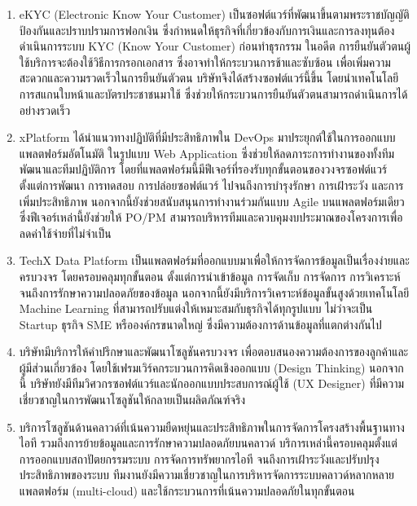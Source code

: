 \begin{enumerate}
  \item eKYC (Electronic Know Your Customer) เป็นซอฟต์แวร์ที่พัฒนาขึ้นตามพระราชบัญญัติป้องกันและปราบปรามการฟอกเงิน ซึ่งกำหนดให้ธุรกิจที่เกี่ยวข้องกับการเงินและการลงทุนต้องดำเนินการระบบ KYC (Know Your Customer) ก่อนทำธุรกรรม ในอดีต การยืนยันตัวตนผู้ใช้บริการจะต้องใช้วิธีการกรอกเอกสาร ซึ่งอาจทำให้กระบวนการช้าและซับซ้อน เพื่อเพิ่มความสะดวกและความรวดเร็วในการยืนยันตัวตน บริษัทจึงได้สร้างซอฟต์แวร์นี้ขึ้น โดยนำเทคโนโลยีการสแกนใบหน้าและบัตรประชาชนมาใช้ ซึ่งช่วยให้กระบวนการยืนยันตัวตนสามารถดำเนินการได้อย่างรวดเร็ว
  \item xPlatform ได้นำแนวทางปฏิบัติที่มีประสิทธิภาพใน DevOps มาประยุกต์ใช้ในการออกแบบแพลตฟอร์มอัตโนมัติ  ในรูปแบบ Web Application ซึ่งช่วยให้ลดภาระการทำงานของทั้งทีมพัฒนาและทีมปฏิบัติการ โดยที่แพลตฟอร์มนี้มีฟีเจอร์ที่รองรับทุกขั้นตอนของวงจรซอฟต์แวร์ ตั้งแต่การพัฒนา การทดสอบ การปล่อยซอฟต์แวร์ ไปจนถึงการบำรุงรักษา การเฝ้าระวัง และการเพิ่มประสิทธิภาพ นอกจากนี้ยังช่วยสนับสนุนการทำงานร่วมกันแบบ Agile บนแพลตฟอร์มเดียว ซึ่งฟีเจอร์เหล่านี้ยังช่วยให้ PO/PM สามารถบริหารทีมและควบคุมงบประมาณของโครงการเพื่อลดค่าใช้จ่ายที่ไม่จำเป็น
  \item TechX Data Platform เป็นแพลตฟอร์มที่ออกแบบมาเพื่อให้การจัดการข้อมูลเป็นเรื่องง่ายและครบวงจร โดยครอบคลุมทุกขั้นตอน ตั้งแต่การนำเข้าข้อมูล การจัดเก็บ การจัดการ การวิเคราะห์ จนถึงการรักษาความปลอดภัยของข้อมูล นอกจากนี้ยังมีบริการวิเคราะห์ข้อมูลขั้นสูงด้วยเทคโนโลยี Machine Learning ที่สามารถปรับแต่งให้เหมาะสมกับธุรกิจได้ทุกรูปแบบ ไม่ว่าจะเป็น Startup ธุรกิจ SME หรือองค์กรขนาดใหญ่ ซึ่งมีความต้องการด้านข้อมูลที่แตกต่างกันไป
  \item บริษัทมีบริการให้คำปรึกษาและพัฒนาโซลูชันครบวงจร เพื่อตอบสนองความต้องการของลูกค้าและผู้มีส่วนเกี่ยวข้อง โดยใช้เฟรมเวิร์คกระบวนการคิดเชิงออกแบบ (Design Thinking) นอกจากนี้ บริษัทยังมีทีมวิศวกรซอฟต์แวร์และนักออกแบบประสบการณ์ผู้ใช้ (UX Designer) ที่มีความเชี่ยวชาญในการพัฒนาโซลูชันให้กลายเป็นผลิตภัณฑ์จริง
  \item บริการโซลูชันด้านคลาวด์ที่เน้นความยืดหยุ่นและประสิทธิภาพในการจัดการโครงสร้างพื้นฐานทางไอที รวมถึงการย้ายข้อมูลและการรักษาความปลอดภัยบนคลาวด์ บริการเหล่านี้ครอบคลุมตั้งแต่การออกแบบสถาปัตยกรรมระบบ การจัดการทรัพยากรไอที จนถึงการเฝ้าระวังและปรับปรุงประสิทธิภาพของระบบ ทีมงานยังมีความเชี่ยวชาญในการบริหารจัดการระบบคลาวด์หลากหลายแพลตฟอร์ม (multi-cloud) และใช้กระบวนการที่เน้นความปลอดภัยในทุกขั้นตอน
\end{enumerate}

\renewcommand{\arraystretch}{1.2}
\newcommand{\attr}[1]{\hspace{2pt}#1\hspace{2pt}}
